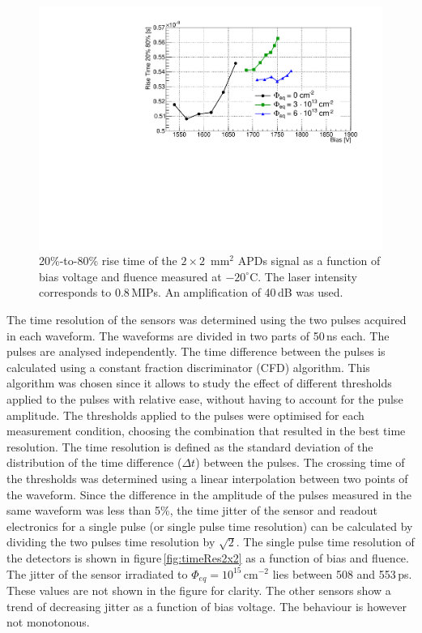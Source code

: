 \documentclass[3p,preprint,twocolumn]{elsarticle}
\begin{document}
\begin{figure}
  \centering
  \includegraphics[width = \columnwidth]{riseTime2x2APDsNo1e15}
  \caption{20\%-to-80\% rise time of the $2 \times 2$~mm$^2$ APDs signal as a function of bias voltage and fluence measured at $-20^\circ$C. The laser intensity corresponds to 0.8\,MIPs. An amplification of 40\,dB was used.}
  \label{fig:riseTime2x2}
\end{figure}

The time resolution of the sensors was determined using the two pulses acquired in each waveform.
The waveforms are divided in two parts of 50\,ns each.
The pulses are analysed independently.
The time difference between the pulses is calculated using a constant fraction discriminator (CFD) algorithm.
This algorithm was chosen since it allows to study the effect of different thresholds applied to the pulses with relative ease, without having to account for the pulse amplitude.
The thresholds applied to the pulses were optimised for each measurement condition, choosing the combination that resulted in the best time resolution.
The time resolution is defined as the standard deviation of the distribution of the time difference ($\Delta t$) between the pulses.
The crossing time of the thresholds was determined using a linear interpolation between two points of the waveform.
Since the difference in the amplitude of the pulses measured in the same waveform was less than 5\%, the time jitter of the sensor and readout electronics for a single pulse (or single pulse time resolution) can be calculated by dividing the two pulses time resolution by $\sqrt{2}$.
The single pulse time resolution of the detectors is shown in figure\,\ref{fig:timeRes2x2} as a function of bias and fluence.
The jitter of the sensor irradiated to $\Phi_{eq} = 10^{15}$\,cm$^{-2}$ lies between 508 and 553\,ps.
These values are not shown in the figure for clarity.
The other sensors show a trend of decreasing jitter as a function of bias voltage.
The behaviour is however not monotonous.
\end{document}
